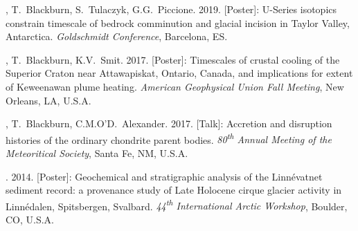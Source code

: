 \begin{etaremune} [itemsep=4pt, leftmargin=3ex]
  \item  \ghedwards, T.~Blackburn, S.~Tulaczyk, G.G.~Piccione. 2019. [Poster]: U-Series isotopics constrain timescale of bedrock comminution and glacial incision in Taylor Valley, Antarctica. \textit{Goldschmidt Conference}, Barcelona, ES.
	
  \item \ghedwards, T.~Blackburn, K.V.~Smit. 2017. [Poster]: Timescales of crustal cooling of the Superior Craton near Attawapiskat, Ontario, Canada, and implications for extent of Keweenawan plume heating. \textit{American Geophysical Union Fall Meeting}, New Orleans, LA, U.S.A.
  
  \item  \ghedwards, T.~Blackburn, C.M.O’D.~Alexander. 2017. [Talk]: Accretion and disruption histories of the ordinary chondrite parent bodies. \textit{80\textsuperscript{th} Annual Meeting of the Meteoritical Society}, Santa Fe, NM, U.S.A.
  
  \item \ghedwards. 2014. [Poster]: Geochemical and stratigraphic analysis of the Linnévatnet sediment record: a provenance study of Late Holocene cirque glacier activity in Linnédalen, Spitsbergen, Svalbard. \textit{44\textsuperscript{th} International Arctic Workshop}, Boulder, CO, U.S.A.
\end{etaremune}




